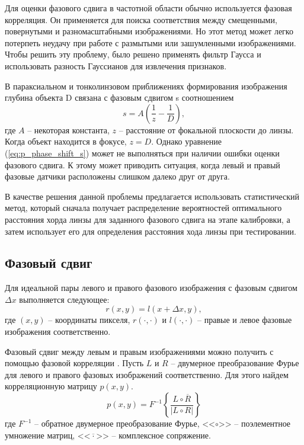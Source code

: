 Для оценки фазового сдвига в частотной области обычно используется фазовая корреляция. Он применяется для поиска соответствия между смещенными, повернутыми и разномасштабными изображениями. Но этот метод может легко потерпеть неудачу при работе с размытыми или зашумленными изображениями. Чтобы решить эту проблему, было решено применять фильтр Гаусса и использовать разность Гауссианов для извлечения признаков.

В параксиальном и тонколинзовом приближениях формирования изображения глубина объекта D связана с фазовым сдвигом s соотношением \cite{AF-Net}
\begin{equation}
	s = A\left( \frac{1}{z} - \frac{1}{D}\right),
	\label{eq:p_phase_shift_s}
\end{equation}
где $A$ -- некоторая константа, $z$ -- расстояние от фокальной плоскости до линзы. Когда объект находится в фокусе, $z = D$. Однако уравнение (\ref{eq:p_phase_shift_s}) может не выполняться при наличии ошибки оценки фазового сдвига. К этому может приводить ситуация, когда левый и правый фазовые датчики расположены слишком далеко друг от друга.

В качестве решения данной проблемы предлагается использовать статистический метод, который сначала получает распределение вероятностей оптимального расстояния хорда линзы для заданного фазового сдвига на этапе калибровки, а затем использует его для определения расстояния хода линзы при тестировании.

\subsection{Фазовый сдвиг}
Для идеальной пары левого и правого фазового изображения с фазовым сдвигом $\Delta x$ выполняется следующее:
\begin{equation}
	r(x, y) = l(x + \Delta x, y),
\end{equation}
где $(x, y)$ -- координаты пикселя, $r(\cdot,\cdot)$ и $l(\cdot,\cdot)$ -- правые и левое фазовые изображения соответственно.

Фазовый сдвиг между левым и правым изображениями можно получить с помощью фазовой корреляции \cite{PhaseCorrelation}. Пусть $L$ и $R$ -- двумерное преобразование Фурье для левого и правого фазовых изображений соответственно. Для этого найдем корреляционную матрицу $p(x, y)$.
\begin{equation}
	p(x, y) = F^{-1} \left\{ \frac{L \circ \overline{R}}{\left| L \circ R \right|} \right\}
\end{equation}
где $F^{-1}$ -- обратное двумерное преобразование Фурье, <<$\circ$>> -- поэлементное умножение матриц, <<$\overline{\cdot}$>> -- комплексное сопряжение.

